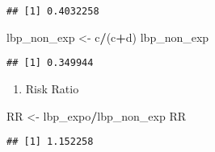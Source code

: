 \documentclass[
]{article}
\newenvironment{Shaded}{\begin{snugshade}}{\end{snugshade}}
\newcommand{\NormalTok}[1]{#1}
\newcommand{\OtherTok}[1]{\textcolor[rgb]{0.56,0.35,0.01}{#1}}
\newcommand{\SpecialCharTok}[1]{\textcolor[rgb]{0.81,0.36,0.00}{\textbf{#1}}}
\providecommand{\tightlist}{%
  \setlength{\itemsep}{0pt}\setlength{\parskip}{0pt}}
\begin{document}
\begin{verbatim}
## [1] 0.4032258
\end{verbatim}

\begin{Shaded}
\begin{Highlighting}[]
\NormalTok{lbp\_non\_exp }\OtherTok{\textless{}{-}}\NormalTok{ c}\SpecialCharTok{/}\NormalTok{(c}\SpecialCharTok{+}\NormalTok{d)}
\NormalTok{lbp\_non\_exp}
\end{Highlighting}
\end{Shaded}

\begin{verbatim}
## [1] 0.349944
\end{verbatim}

\begin{enumerate}
\def\labelenumi{\arabic{enumi}.}
\setcounter{enumi}{1}
\tightlist
\item
  Risk Ratio
\end{enumerate}

\begin{Shaded}
\begin{Highlighting}[]
\NormalTok{RR }\OtherTok{\textless{}{-}}\NormalTok{ lbp\_expo}\SpecialCharTok{/}\NormalTok{lbp\_non\_exp}
\NormalTok{RR}
\end{Highlighting}
\end{Shaded}

\begin{verbatim}
## [1] 1.152258
\end{verbatim}
\end{document}
